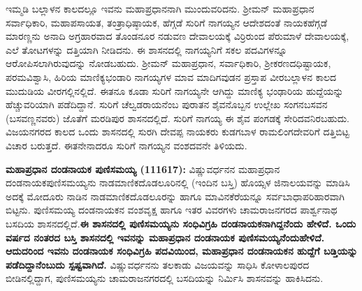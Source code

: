 ಇಮ್ಮಡಿ ಬಲ್ಲಾಳನ ಕಾಲದಲ್ಲೂ ಇವನು ಮಹಾಪ್ರಧಾನನಾಗಿ ಮುಂದುವರಿದನು. ಶ‍್ರೀಮನ್​ ಮಹಾಪ್ರಧಾನ ಸರ್ವಾಧಿಕಾರಿ, ಮಹಾಪಸಾಯತ, ತಂತ್ರಾಧಿಷ್ಠಾಯಕ, ಹೆಗ್ಗಡೆ ಸುರಿಗೆ ನಾಗಯ್ಯನ ಆದೇಶದಂತೆ ನಾಯಕಹೆಗ್ಗಡೆ ಮಾರಣ್ಣನು ಅನಾದಿ ಅಗ್ರಹಾರವಾದ ತೊಂಡನೂರ ನಡುವಣ ದೇವಾಲಯಕ್ಕೆ ವಿರ್ರಿರುಂದ ಪೆರುಮಾಳೆ ದೇವಾಲಯಕ್ಕೆ, ಎಲೆ ತೋಟಗಳನ್ನು ದತ್ತಿಯಾಗಿ ನೀಡಿದನು. ಈ ಶಾಸನದಲ್ಲಿ ನಾಗಯ್ಯನಿಗೆ ಸಕಲ ಪದವಿಗಳನ್ನೂ ಆರೋಪಿಸಲಾಗಿರುವುದನ್ನು ನೋಡಬಹುದು. ಶ‍್ರೀಮನ್​ ಮಹಾಪ್ರಧಾನ, ಸರ್ವಾಧಿಕಾರಿ, ಶ‍್ರೀಕರಣದಧಿಷ್ಟಾಯಕ, ಪರಮವಿಶ್ವಾಸಿ, ಹಿರಿಯ ಮಾಣಿಕ್ಯಭಂಡಾರಿ ನಾಗಯ್ಯಗಳ ಮಾವ ಮಾದಿಗವುಡನ ಪ್ರಸ್ತಾಪ ವೀರಬಲ್ಲಾಳನ ಕಾಲದ ಮುದುಡಿಯ ವೀರಗಲ್ಲಿನಲ್ಲಿದೆ. ಈತನೂ ಕೂಡಾ ಸುರಿಗೆ ನಾಗಯ್ಯನೇ ಆಗಿದ್ದು ಮಾಣಿಕ್ಯ ಭಂಢಾರಿಯ ಹುದ್ದೆಯನ್ನು ಹೆಚ್ಚುವರಿಯಾಗಿ ಪಡೆದಿದ್ದಾನೆ. ಸುರಿಗೆ ಚೆಲ್ವಡರಾಯನೆಂಬ ಪುರಾತನ ಶೈವನೊಬ್ಬನ ಉಲ್ಲೇಖ ಸಂಗನಬಸವನ (ಬಸವಣ್ಣನವರು) ಜೊತೆಗೆ ಮರಡಿಪುರ ಶಾಸನದಲ್ಲಿದೆ. ಸುರಿಗೆ ನಾಗಯ್ಯ ಈ ಶೈವ ಪಂಗಡಕ್ಕೆ ಸೇರಿದವನಿರಬಹುದು. ವಿಜಯನಗರದ ಕಾಲದ ಒಂದು ಶಾಸನದಲ್ಲಿ ಸುರಗಿ ದೇವಪ್ಪ ನಾಯಕರು ಕುಡಗಬಾಳ ರಾಮಲಿಂಗದೇವರಿಗೆ ದತ್ತಿಬಿಟ್ಟ ವಿಚಾರ ಬರುತ್ತದೆ. ಈತನೇನಾದರೂ ಸುರಿಗೆ ನಾಗಯ್ಯನ ವಂಶದವನೇ ತಿಳಿಯದು.

\textbf{ಮಹಾಪ್ರಧಾನ ದಂಡನಾಯಕ ಪುಣಿಸಮಯ್ಯ (1116\general{\enginline{-}}17): }ವಿಷ್ಣುವರ್ಧನನ ಮಹಾಪ್ರಧಾನ ದಂಡನಾಯಕ\break ಪುಣಿಸಮಯ್ಯನು ನಾಡಮಾಣಿಕದೊಡಲೂರಿನಲ್ಲಿ (ಇಂದಿನ ಬಸ್ತಿ) ಹೊಯ್ಸಳ ಜಿನಾಲಯವನ್ನು ಮಾಡಿಸಿ ಅದಕ್ಕೆ ಮೋದೂರು ನಾಡಿನ ನಾಡಮಾಣಿಕದೊಡಲೂರನ್ನು ಹಾಗೂ ಮಾವಿನಕೆರೆಯನ್ನೂ ಸರ್ವಬಾಧಾಪರಿಹಾರವಾಗಿ ಬಿಟ್ಟನು. ಪುಣಿಸಮಯ್ಯ ದಂಡನಾಯಕನ ವಂಶವೃಕ್ಷ ಹಾಗೂ ಇತರ ವಿವರಗಳು ಚಾಮರಾಜನಗರದ ಪಾರ್ಶ್ವನಾಥ ಬಸದಿಯ ಶಾಸನದಲ್ಲಿದೆ.\textbf{ಈ ಶಾಸನದಲ್ಲಿ ಪುಣಿಸಮಯ್ಯನು ಸಂಧಿವಿಗ್ರಹಿ ದಂಡನಾಯಕನಾಗಿದ್ದನೆಂದು ಹೇಳಿದೆ. ಒಂದು ವರ್ಷದ ನಂತರದ ಬಸ್ತಿ ಶಾಸನದಲ್ಲಿ ಇವನನ್ನು ಮಹಾಪ್ರಧಾನ ದಂಡನಾಯಕ ಪುಣಿಸಮಯ್ಯನೆಂದುಹೇಳಿದೆ. ಆದುದರಿಂದ ಇವನು ದಂಡನಾಯಕ ಸಂಧಿವಿಗ್ರಹಿ ಪದವಿಯಿಂದ, ಮಹಾಪ್ರಧಾನ ದಂಡನಾಯಕನ ಹುದ್ದೆಗೆ ಬಡ್ತಿಯನ್ನು ಪಡೆದಿದ್ದಾನೆಂಬುದು ಸ್ಪಷ್ಟವಾಗಿದೆ.} ವಿಷ್ಣುವರ್ಧನನು ತಲಕಾಡು ವಿಜಯವನ್ನು ಸಾಧಿಸಿ ಕೋಳಾಲಪುರದ ಬೀಡಿನಲ್ಲಿದ್ದಾಗ, ಪುಣಿಸಮಯ್ಯನು ಚಾಮರಾಜನಗರದಲ್ಲಿ ಬಸದಿಯನ್ನು ನಿರ್ಮಿಸಿ ಶಾಸನವನ್ನು ಹಾಕಿಸಿದನು.

